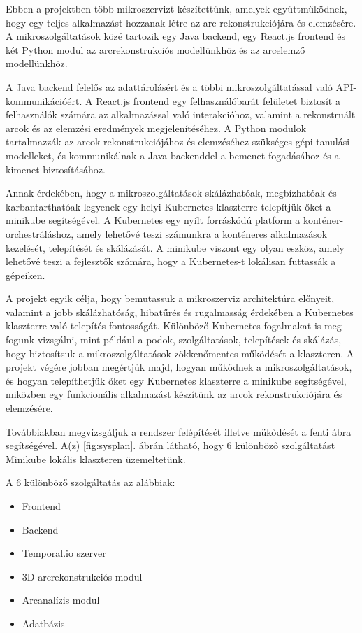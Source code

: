 \documentclass[12pt,a4]{article}
\begin{document}
            Ebben a projektben több mikroszervizt készítettünk, amelyek együttműködnek, hogy egy teljes alkalmazást hozzanak létre az arc rekonstrukciójára és elemzésére. A mikroszolgáltatások közé tartozik egy Java backend, egy React.js frontend és két Python modul az arcrekonstrukciós modellünkhöz és az arcelemző modellünkhöz.

            A Java backend felelős az adattárolásért és a többi mikroszolgáltatással való API-kommunikációért. A React.js frontend egy felhasználóbarát felületet biztosít a felhasználók számára az alkalmazással való interakcióhoz, valamint a rekonstruált arcok és az elemzési eredmények megjelenítéséhez. A Python modulok tartalmazzák az arcok rekonstrukciójához és elemzéséhez szükséges gépi tanulási modelleket, és kommunikálnak a Java backenddel a bemenet fogadásához és a kimenet biztosításához.

            Annak érdekében, hogy a mikroszolgáltatások skálázhatóak, megbízhatóak és karbantarthatóak legyenek egy helyi Kubernetes klaszterre telepítjük őket a minikube segítségével. A Kubernetes egy nyílt forráskódú platform a konténer-orchestráláshoz, amely lehetővé teszi számunkra a konténeres alkalmazások kezelését, telepítését és skálázását. A minikube viszont egy olyan eszköz, amely lehetővé teszi a fejlesztők számára, hogy a Kubernetes-t lokálisan futtassák a gépeiken.

            A projekt egyik célja, hogy bemutassuk a mikroszerviz architektúra előnyeit, valamint a jobb skálázhatóság, hibatűrés és rugalmasság érdekében a Kubernetes klaszterre való telepítés fontosságát. Különböző Kubernetes fogalmakat is meg fogunk vizsgálni, mint például a podok, szolgáltatások, telepítések és skálázás, hogy biztosítsuk a mikroszolgáltatások zökkenőmentes működését a klaszteren. A projekt végére jobban megértjük majd, hogyan működnek a mikroszolgáltatások, és hogyan telepíthetjük őket egy Kubernetes klaszterre a minikube segítségével, miközben egy funkcionális alkalmazást készítünk az arcok rekonstrukciójára és elemzésére.

        	Továbbiakban megvizsgáljuk a rendszer felépítését illetve mükődését a
        	fenti ábra segítségével. A(z) \ref{fig:sysplan}. ábrán látható, hogy 6 különböző szolgáltatást Minikube lokális klaszteren üzemeltetünk.

        	A 6 különböző szolgáltatás az alábbiak:
        	\begin{itemize}
        		\item Frontend
        		\item Backend
        		\item Temporal.io szerver
        		\item 3D arcrekonstrukciós modul
        		\item Arcanalízis modul
        		\item Adatbázis
        	\end{itemize}
        
\end{document}
